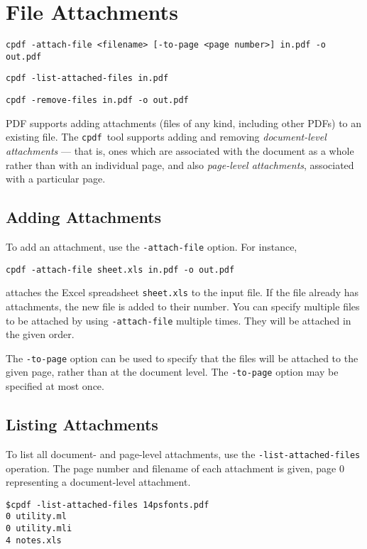 \documentclass{book}
\newcommand{\cpdf}{\texttt{cpdf}}
\begin{document}
\chapter{File Attachments}\pagestyle{fancy}
\begin{framed}
  \small\noindent\verb!cpdf -attach-file <filename> [-to-page <page number>] in.pdf -o out.pdf!

  \vspace{1.5mm}
  \small\noindent\verb!cpdf -list-attached-files in.pdf!
 
  \vspace{1.5mm}
  \small\noindent\verb!cpdf -remove-files in.pdf -o out.pdf!
\end{framed}
  PDF supports adding attachments (files of any kind, including other PDFs) to
an existing file. The \cpdf\ tool supports adding and removing \textit{document-level
attachments} --- that is, ones which are associated with the document as a
whole rather than with an individual page, and also \textit{page-level attachments}, associated with a particular page.
  \section{Adding Attachments}
  To add an attachment, use the \texttt{-attach-file} option. For instance,
  \begin{framed}
  \small\verb!cpdf -attach-file sheet.xls in.pdf -o out.pdf!
  \end{framed}
  \noindent attaches the Excel spreadsheet \texttt{sheet.xls} to the input file. If the file already has attachments, the new file is added to their number. You can specify multiple files to be attached by using \verb!-attach-file! multiple times. They will be attached in the given order.
  
  The \texttt{-to-page} option can be used to specify that the files will be attached to the given page, rather than at the document level. The \texttt{-to-page} option may be specified at most once. 

\section{Listing Attachments}
To list all document- and page-level attachments, use the \texttt{-list-attached-files} operation. The page number and filename of each attachment is given, page 0 representing a document-level attachment.
\begin{framed}
{\small\begin{verbatim}
$cpdf -list-attached-files 14psfonts.pdf
0 utility.ml
0 utility.mli
4 notes.xls
\end{verbatim}}
\end{framed}
\end{document}
